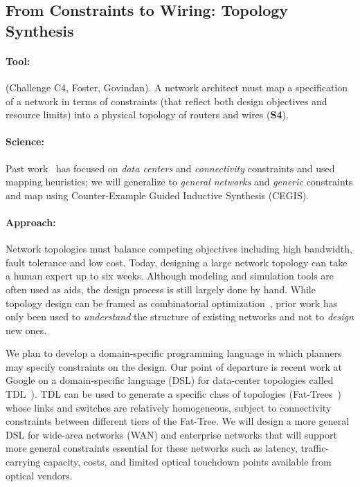 \subsection{From Constraints to Wiring: Topology Synthesis}

\paragraph*{Tool:} (Challenge C4, Foster, Govindan). A network
architect must map a specification of a network in terms of
constraints (that reflect both design objectives and resource limits)
into a physical topology of routers and wires ({\bf S4}).
%
\paragraph*{Science:} Past work~\cite{condor} has focused on {\em data
  centers} and {\em connectivity} constraints and used mapping
heuristics; we will generalize to {\em general networks} and {\em
  generic} constraints and map using Counter-Example Guided Inductive
Synthesis (CEGIS).



\paragraph*{Approach:}
%
Network topologies must balance competing objectives including high
bandwidth, fault tolerance and low cost. Today, designing a large
network topology can take a human expert up to six weeks. Although
modeling and simulation tools are often used as aids, the design
process is still largely done by hand.  While topology design can be
framed as combinatorial optimization~\cite{PA,
  Hongsuda,HOT}, prior work has only been used to {\em understand}
the structure of existing networks and not to {\em design} new ones.

We plan to develop a domain-specific programming language in which
planners may specify constraints on the design.  Our point of
departure is recent work at Google on a domain-specific language (DSL)
for data-center topologies called TDL~\cite{condor}). TDL can be used
to generate a specific class of topologies (Fat-Trees~\cite{FatTree})
whose links and switches are relatively homogeneous, subject to
connectivity constraints between different tiers of the Fat-Tree. We
will design a more general DSL for wide-area networks (WAN) and
enterprise networks that will support more general constraints
essential for these networks such as latency, traffic-carrying
capacity, costs, and limited optical touchdown points available from
optical vendors.

